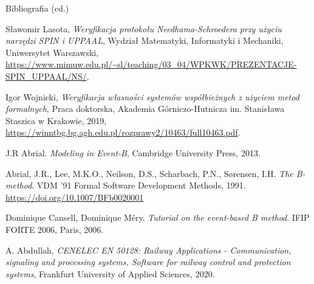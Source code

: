 \documentclass{beamer}
\begin{document}
\begin{frame}{Bibliografia (cd.)}
  \scriptsize
  \begin{thebibliography}{9}
    Sławomir Lasota,
    \textit{Weryfikacja protokołu Needhama-Schroedera przy użyciu narzędzi SPIN i UPPAAL},
    Wydział Matematyki, Informatyki i Mechaniki, Uniwersytet Warszawski,
    \url{https://www.mimuw.edu.pl/~sl/teaching/03_04/WPKWK/PREZENTACJE-SPIN_UPPAAL/NS/}.

    Igor Wojnicki,
    \textit{Weryfikacja własności systemów współbieżnych z użyciem metod formalnych},
    Praca doktorska, Akademia Górniczo-Hutnicza im. Stanisława Staszica w Krakowie, 2019,
    \url{https://winntbg.bg.agh.edu.pl/rozprawy2/10463/full10463.pdf}.

    J.R Abrial. \emph{Modeling in Event-B}, Cambridge University Press, 2013.

    Abrial, J.R., Lee, M.K.O., Neilson, D.S., Scharbach, P.N., Sørensen, I.H. \emph{The B-method}. VDM '91 Formal Software Development Methods, 1991. \url{https://doi.org/10.1007/BFb0020001}

    Dominique Cansell, Dominique Méry. \emph{Tutorial on the event-based B method}. IFIP FORTE 2006, Paris, 2006.

    A. Abdullah, \emph{CENELEC EN 50128: Railway Applications - Communication, signaling and processing systems, Software for railway control and protection systems}, Frankfurt University of Applied Sciences, 2020.
  \end{thebibliography}
\end{frame}
\end{document}
